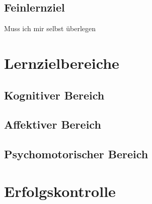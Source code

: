 \subsection{Feinlernziel}
Muss ich mir selbst überlegen 
\section{Lernzielbereiche}

\subsection{Kognitiver Bereich}

\subsection{Affektiver Bereich}

\subsection{Psychomotorischer Bereich}

\section{Erfolgskontrolle}



